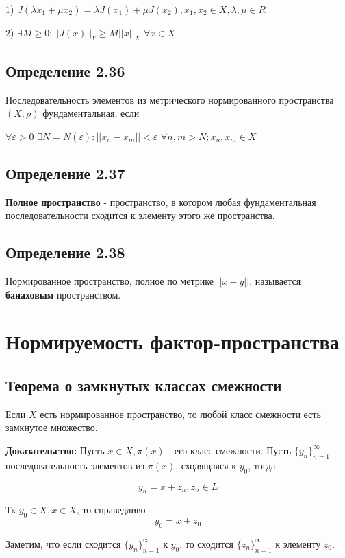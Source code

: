 \documentclass[12pt]{article}
\begin{document}
	1) $J(\lambda x_1 + \mu x_2) = \lambda J(x_1) + \mu J(x_2), x_1, x_2 \in X, \lambda, \mu \in R$

	2) $\exists M \ge 0 : ||J(x)||_Y \ge M||x||_X$ $\forall x \in X$
	
\subsection{Определение 2.36}
	Последовательность элементов из метрического нормированного пространства $(X,\rho)$ фундаментальная, если
	
	$\forall \varepsilon > 0$ $\exists N = N(\varepsilon) : ||x_n - x_m|| < \varepsilon$ $\forall n, m > N; x_n, x_m \in X$  
	
\subsection{Определение 2.37}
	\textbf{Полное пространство} - пространство, в котором любая фундаментальная последовательности сходится
	к элементу этого же пространства.

\subsection{Определение 2.38}
	Нормированное пространство, полное по метрике $||x - y||$, называется \textbf{банаховым} пространством.	

\newpage
\section{Нормируемость фактор-пространства}	
	
\subsection{Теорема о замкнутых классах смежности}

	Если $X$ есть нормированное пространство, то любой класс смежности есть замкнутое множество.
	
	\textbf{Доказательство:}
	Пусть $x \in X , \pi(x)$ - его класс смежности. 
	Пусть $\{ y_n \}_{n = 1}^{\infty}$ последовательность элементов из $\pi(x)$, сходящаяся к $y_0$, тогда
	
	$$y_n = x + z_n , z_n \in L $$
	
	Тк $y_0 \in X, x \in X$, то справедливо 
	$$y_0 = x + z_0$$
	
	Заметим, что если сходится  $\{ y_n \}_{n = 1}^{\infty}$ к $y_0$, то сходится $\{ z_n \}_{n = 1}^{\infty}$ к элементу $z_0$. 
\end{document}
